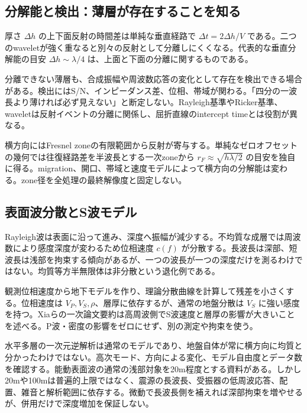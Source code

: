 \subsection{分解能と検出：薄層が存在することを知る}
\label{theory:exploration:resolution}
厚さ \(\Delta h\) の上下面反射の時間差は単純な垂直経路で \(\Delta t=2\Delta h/V\) である。二つのwaveletが強く重なると別々の反射として分離しにくくなる。代表的な垂直分解能の目安 \(\Delta h\sim\lambda/4\) は、上面と下面の分離に関するものである\cite{seg_vertical_resolution}。

分離できない薄層も、合成振幅や周波数応答の変化として存在を検出できる場合がある。検出にはS/N、インピーダンス差、位相、帯域が関わる。「四分の一波長より薄ければ必ず見えない」と断定しない。Rayleigh基準やRicker基準、waveletは反射イベントの分離に関係し、屈折直線のintercept timeとは役割が異なる。

横方向にはFresnel zoneの有限範囲から反射が寄与する\cite{seg_lateral_resolution}。単純なゼロオフセットの幾何では往復経路差を半波長とする一次zoneから \(r_F\approx\sqrt{h\lambda/2}\) の目安を独自に得る。migration、開口、帯域と速度モデルによって横方向の分解能は変わる。zone径を全処理の最終解像度と固定しない。

\subsection{表面波分散とS波モデル}
\label{theory:exploration:surfacewaves}
Rayleigh波は表面に沿って進み、深度へ振幅が減少する。不均質な成層では周波数により感度深度が変わるため位相速度 \(c(f)\) が分散する。長波長は深部、短波長は浅部を拘束する傾向があるが、一つの波長が一つの深度だけを測るわけではない\cite{epa_surfacewaves}。均質等方半無限体は非分散という退化例である。

観測位相速度から地下モデルを作り、理論分散曲線を計算して残差を小さくする。位相速度は \(V_P,V_S,\rho\)、層厚に依存するが、通常の地盤分散は \(V_S\) に強い感度を持つ。Xiaらの一次論文要約は高周波側でS波速度と層厚の影響が大きいことを述べる\cite{xia_rayleigh1999}。P波・密度の影響をゼロにせず、別の測定や拘束を使う。

水平多層の一次元逆解析は通常のモデルであり、地盤自体が常に横方向に均質と分かったわけではない。高次モード、方向による変化、モデル自由度とデータ数を確認する。能動表面波の通常の浅部対象を20m程度とする資料がある\cite{moe_surface2004}。しかし20mや100mは普遍的上限ではなく、震源の長波長、受振器の低周波応答、配置、雑音と解析範囲に依存する。微動で長波長側を補えれば深部拘束を増やせるが、併用だけで深度増加を保証しない。

